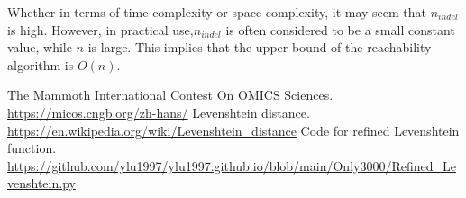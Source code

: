 \documentclass{article}
\begin{document}
Whether in terms of time complexity or space complexity, it may seem that $n_{indel}$ is high. However, in practical use,$n_{indel}$ is often considered to be a small constant value, while $n$ is large. This implies that the upper bound of the reachability algorithm is $O(n)$.

\begin{thebibliography}{99}  

 The Mammoth International Contest On OMICS Sciences. \url{https://micos.cngb.org/zh-hans/}
 Levenshtein distance. \url{https://en.wikipedia.org/wiki/Levenshtein_distance}
 Code for refined Levenshtein function.
\url{https://github.com/ylu1997/ylu1997.github.io/blob/main/Only3000/Refined_Levenshtein.py}
\end{thebibliography}
\end{document}

